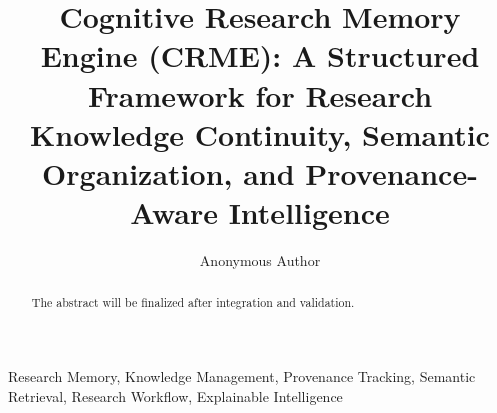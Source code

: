 \documentclass[conference]{IEEEtran}
\title{
Cognitive Research Memory Engine (CRME):
A Structured Framework for Research Knowledge Continuity,
Semantic Organization, and Provenance-Aware Intelligence
}
\author{
Anonymous Author
}
\begin{document}
\maketitle



\begin{abstract}

The abstract will be finalized after integration and validation.

\end{abstract}


\begin{IEEEkeywords}
Research Memory,
Knowledge Management,
Provenance Tracking,
Semantic Retrieval,
Research Workflow,
Explainable Intelligence
\end{IEEEkeywords}
















\end{document}
